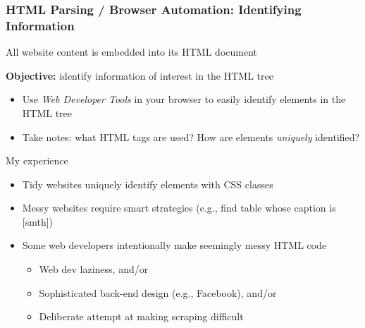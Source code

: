 \documentclass[10pt, aspectratio=1610, natbib, handout]{beamer}
\begin{document}
  \begin{frame}
    \frametitle{HTML Parsing / Browser Automation: Identifying Information}

    All website content is embedded into its HTML document

    \vfill\pause

    \textbf{Objective:} identify information of interest in the HTML tree

    \vfill\pause

    \begin{itemize}
      \item Use \textit{Web Developer Tools} in your browser to easily identify elements in the HTML tree
      \item Take notes: what HTML tags are used? How are elements \textit{uniquely} identified?
    \end{itemize}

    \vfill\pause

    My experience
    \begin{itemize}
      \item Tidy websites uniquely identify elements with CSS classes
      \item Messy websites require smart strategies (e.g., find table whose caption is [smth])
      \item Some web developers intentionally make seemingly messy HTML code
        \begin{itemize}
          \item Web dev laziness, and/or
          \item Sophisticated back-end design (e.g., Facebook), and/or
          \item Deliberate attempt at making scraping difficult
        \end{itemize}
    \end{itemize}

  \end{frame}
\end{document}
